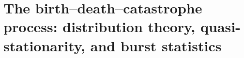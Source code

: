 
\chapter{The birth--death--catastrophe process: distribution theory,
quasi-stationarity, and burst statistics}
\label{dist:ch:distribution-theory}














\FloatBarrier
\begingroup
\renewcommand{\theHsection}{\thechapter.appendix.\Alph{section}}
\renewcommand{\theHsubsection}{\theHsection.\arabic{subsection}}
\renewcommand{\theHsubsubsection}{\theHsubsection.\arabic{subsubsection}}



\endgroup
